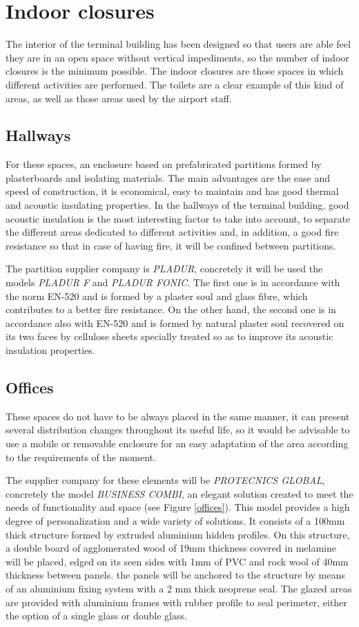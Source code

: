 \chapter{Indoor closures}
The interior of the terminal building has been designed so that users are able feel they are in an open space without vertical impediments, so the number of indoor closures is the minimum possible. The indoor closures are those spaces in which different activities are performed. The toilets are a clear example of this kind of areas, as well as those areas used by the airport staff.

	\section{Hallways}
For these spaces, an enclosure based on prefabricated partitions formed by plasterboards and isolating materials. The main advantages are the ease and speed of construction, it is economical, easy to maintain and has good thermal and acoustic insulating properties. In the hallways of the terminal building, good acoustic insulation is the most interesting factor to take into account, to separate the different areas dedicated to different activities and, in addition, a good fire resistance so that in case of having fire, it will be confined between partitions.
		
The partition supplier company is \textit{PLADUR\textregistered{}}, concretely it will be used the models \textit{PLADUR\textregistered{} F} and \textit{PLADUR\textregistered{} FONIC}. The first one is in accordance with the norm EN-520 and is formed by a plaster soul and glass fibre, which contributes to a better fire resistance. On the other hand, the second one is in accordance also with EN-520 and is formed by natural plaster soul recovered on its two faces by cellulose sheets specially treated so as to improve its acoustic insulation properties.

	\section{Offices}
These spaces do not have to be always placed in the same manner, it can present several distribution changes throughout its useful life, so it would be advisable to use a mobile or removable enclosure for an easy adaptation of the area according to the requirements of the moment.

The supplier company for these elements will be \textit{PROTECNICS GLOBAL}, concretely the model \textit{BUSINESS COMBI}, an elegant solution created to meet the needs of functionality and space (see Figure \ref{offices}). This model provides a high degree of personalization and a wide variety of solutions. It consists of a 100mm thick structure formed by extruded aluminium hidden profiles. On this structure, a double board of agglomerated wood of 19mm thickness covered in melamine will be placed, edged on its seen sides with 1mm of PVC and rock wool of 40mm thickness between panels. the panels will be anchored to the structure by means of an aluminium fixing system with a 2 mm thick neoprene seal. The glazed areas are provided with aluminium frames with rubber profile to seal perimeter, either the option of a single glass or double glass.

